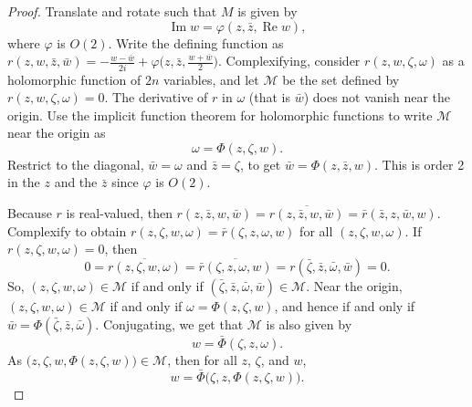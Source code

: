 \documentclass[12pt,openany]{book}
\renewcommand{\Re}{\operatorname{Re}}
\renewcommand{\Im}{\operatorname{Im}}
\newcommand{\sM}{{\mathscr{M}}}
\theoremstyle{plain}
\theoremstyle{remark}
\theoremstyle{definition}
\theoremstyle{exercise}
\theoremstyle{example}
\begin{document}
\begin{proof}
Translate and rotate such that $M$ is given by
\begin{equation*}
\Im w = \varphi(z,\bar{z},\Re w) ,
\end{equation*}
where $\varphi$ is $O(2)$.
Write the defining function
as $r(z,w,\bar{z},\bar{w}) = -\frac{w-\bar{w}}{2i}
+\varphi\bigl(z,\bar{z},\frac{w+\bar{w}}{2}\bigr)$.
Complexifying, consider
$r(z,w,\zeta,\omega)$ as
a holomorphic function of $2n$ variables,
and let $\sM$ be the set defined by
$r(z,w,\zeta,\omega) = 0$.
The derivative of $r$ in
$\omega$ (that is $\bar{w}$) does not vanish near the origin.
Use the implicit function theorem for holomorphic functions to write $\sM$
near the origin as
\begin{equation*}
\omega = \Phi(z,\zeta,w) .
\end{equation*}
Restrict to the diagonal, $\bar{w} = \omega$ and $\bar{z}=\zeta$,
to get
$\bar{w} = \Phi(z,\bar{z},w)$.  This is order 2 in the $z$ and the $\bar{z}$
since $\varphi$ is $O(2)$.

Because $r$ is real-valued, then
$r(z,\bar{z},w,\bar{w}) =
\overline{r(z,\bar{z},w,\bar{w})} = \bar{r}(\bar{z},z,\bar{w},w)$.
Complexify to obtain
$r(z,\zeta,w,\omega) =
\bar{r}(\zeta,z,\omega,w)$ for all $(z,\zeta,w,\omega)$.
If $r(z,\zeta,w,\omega) = 0$,
then 
\begin{equation*}
0 = \overline{r(z,\zeta,w,\omega)} =
\overline{\bar{r}(\zeta,z,\omega,w)} =
r(\bar{\zeta},\bar{z},\bar{\omega},\bar{w}) =0.
\end{equation*}
So,
$(z,\zeta,w,\omega) \in \sM$
if and only if
$(\bar{\zeta},\bar{z},\bar{\omega},\bar{w}) \in \sM$.
Near the origin,
$(z,\zeta,w,\omega) \in \sM$ if and only if
$\omega = \Phi(z,\zeta,w)$, and hence
if and only if
$\bar{w} = \Phi(\bar{\zeta},\bar{z},\bar{\omega})$.
Conjugating, we get that $\sM$ is also given by
\begin{equation*}
w = \bar{\Phi}(\zeta,z,\omega).
\end{equation*}
As $\bigl(z,\zeta,w,\Phi(z,\zeta,w)\bigr) \in \sM$, then
for all $z$, $\zeta$, and $w$,
\begin{equation*}
w = \bar{\Phi}\bigl(\zeta,z,\Phi(z,\zeta,w)\bigr).
\end{equation*}


\end{proof}
\end{document}
